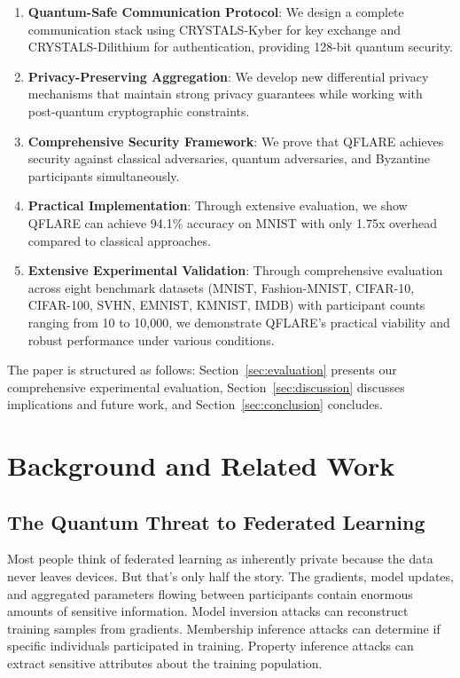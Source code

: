 \documentclass[journal,onecolumn]{IEEEtran}
\begin{document}
\begin{enumerate}
\item \textbf{Quantum-Safe Communication Protocol}: We design a complete communication stack using CRYSTALS-Kyber for key exchange and CRYSTALS-Dilithium for authentication, providing 128-bit quantum security.

\item \textbf{Privacy-Preserving Aggregation}: We develop new differential privacy mechanisms that maintain strong privacy guarantees while working with post-quantum cryptographic constraints.

\item \textbf{Comprehensive Security Framework}: We prove that QFLARE achieves security against classical adversaries, quantum adversaries, and Byzantine participants simultaneously.

\item \textbf{Practical Implementation}: Through extensive evaluation, we show QFLARE can achieve 94.1\% accuracy on MNIST with only 1.75x overhead compared to classical approaches.

\item \textbf{Extensive Experimental Validation}: Through comprehensive evaluation across eight benchmark datasets (MNIST, Fashion-MNIST, CIFAR-10, CIFAR-100, SVHN, EMNIST, KMNIST, IMDB) with participant counts ranging from 10 to 10,000, we demonstrate QFLARE's practical viability and robust performance under various conditions.
\end{enumerate}

The paper is structured as follows: Section~\ref{sec:evaluation} presents our comprehensive experimental evaluation, Section~\ref{sec:discussion} discusses implications and future work, and Section~\ref{sec:conclusion} concludes.

\section{Background and Related Work}

\subsection{The Quantum Threat to Federated Learning}

Most people think of federated learning as inherently private because the data never leaves devices. But that's only half the story. The gradients, model updates, and aggregated parameters flowing between participants contain enormous amounts of sensitive information. Model inversion attacks can reconstruct training samples from gradients. Membership inference attacks can determine if specific individuals participated in training. Property inference attacks can extract sensitive attributes about the training population.
\end{document}
